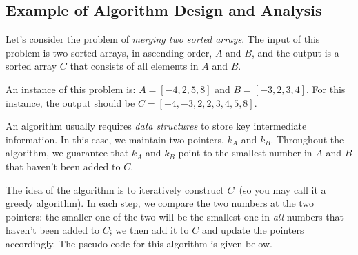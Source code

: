 \subsection*{Example of Algorithm Design and Analysis}

Let's consider the problem of \emph{merging two sorted arrays}. The input of this problem is two sorted arrays, in ascending order, $A$ and $B$,
and the output is a sorted array $C$ that consists of all elements in $A$ and $B$.

An instance of this problem is: $A = [-4, 2, 5, 8]$ and $B = [-3, 2, 3, 4]$. For this instance, the output should be $C = [-4, -3, 2, 2, 3, 4, 5, 8]$.

An algorithm usually requires \emph{data structures} to store key intermediate information.
In this case, we maintain two pointers, $k_A$ and $k_B$. Throughout the algorithm,
we guarantee that $k_A$ and $k_B$ point to the smallest number in $A$ and $B$ that haven't been added to $C$.

The idea of the algorithm is to iteratively construct $C$~(so you may call it a greedy algorithm).
In each step, we compare the two numbers at the two pointers: the smaller one of the two will be the smallest one
in \emph{all} numbers that haven't been added to $C$; we then add it to $C$ and update the pointers accordingly.
The pseudo-code for this algorithm is given below.

\begin{minipage}{0.8\textwidth}
	\xxx
	\xxx
	\xxx
	\xxx
	\xxx
	\xxx
	\xxx
	\xxx
	\xxx
	\xxx
	\xxx
	\xxx
	\xxx
	\xxx
	\xxx
\end{minipage}

